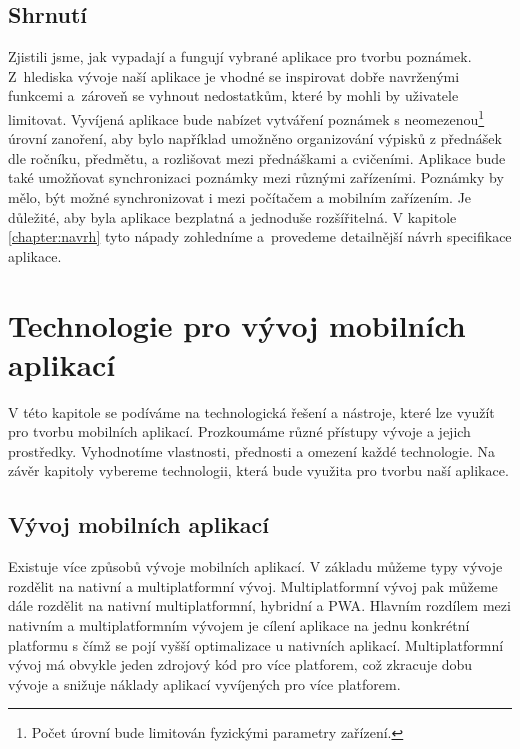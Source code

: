 \documentclass[czech, bc, kiv, he, iso690numb]{fasthesis}
\begin{document}

\section{Shrnutí}

Zjistili jsme, jak vypadají a fungují vybrané aplikace pro tvorbu poznámek. Z~hlediska vývoje naší aplikace je vhodné se inspirovat dobře navrženými funkcemi a~zároveň se vyhnout nedostatkům, které by mohli by uživatele limitovat. Vyvíjená aplikace bude nabízet vytváření poznámek s neomezenou\footnote{Počet úrovní bude limitován fyzickými parametry zařízení.} úrovní zanoření, aby bylo například umožněno organizování výpisků z přednášek dle ročníku, předmětu, a rozlišovat mezi přednáškami a cvičeními. Aplikace bude také umožňovat synchronizaci poznámky mezi různými zařízeními. Poznámky by mělo, být možné synchronizovat i mezi počítačem a mobilním zařízením. Je důležité, aby byla aplikace bezplatná a jednoduše rozšířitelná. V kapitole \ref{chapter:navrh} tyto nápady zohledníme a~provedeme detailnější návrh specifikace aplikace. 

%
%
%
%
\chapter{Technologie pro vývoj mobilních aplikací}

V této kapitole se podíváme na technologická řešení a nástroje, které lze využít pro tvorbu mobilních aplikací. Prozkoumáme různé přístupy vývoje a jejich prostředky. Vyhodnotíme vlastnosti, přednosti a omezení každé technologie. Na závěr kapitoly vybereme technologii, která bude využita pro tvorbu naší aplikace.

\section{Vývoj mobilních aplikací}

Existuje více způsobů vývoje mobilních aplikací. V základu můžeme typy vývoje rozdělit na nativní a multiplatformní vývoj. Multiplatformní vývoj pak můžeme dále rozdělit na nativní multiplatformní, hybridní a \gls{PWA}. Hlavním rozdílem mezi nativním a multiplatformním vývojem je cílení aplikace na jednu konkrétní platformu s čímž se pojí vyšší optimalizace u nativních aplikací. Multiplatformní vývoj má obvykle jeden zdrojový kód pro více platforem, což zkracuje dobu vývoje a snižuje náklady aplikací vyvíjených pro více platforem. \cite{Difference-native-non-native}
\end{document}
